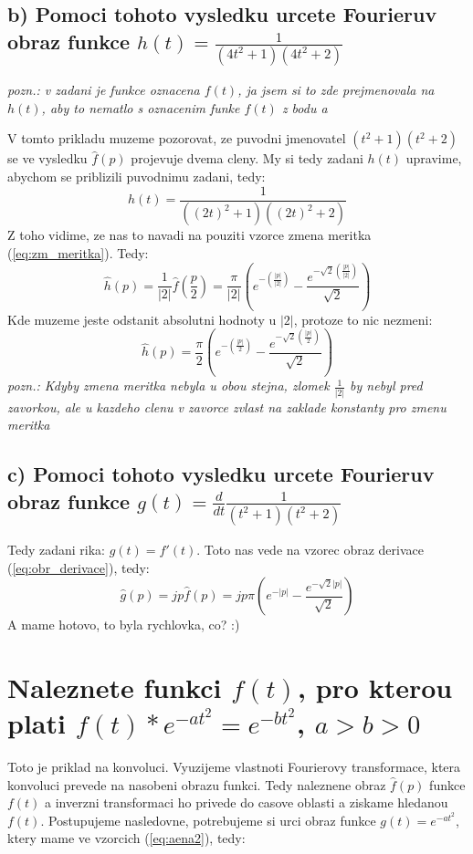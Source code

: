 \newpage

\subsection{b) Pomoci tohoto vysledku urcete Fourieruv obraz funkce $h(t)=\frac{1}{(4t^2+1)(4t^2+2)}$}
\textit{pozn.: v zadani je funkce oznacena $f(t)$, ja jsem si to zde prejmenovala na $h(t)$, aby to nematlo s oznacenim funke $f(t)$ z bodu a}

V tomto prikladu muzeme pozorovat, ze puvodni jmenovatel $(t^2+1)(t^2+2)$ se ve vysledku $\hat{f}(p)$ projevuje dvema cleny. My si tedy zadani $h(t)$ upravime, abychom se priblizili puvodnimu zadani, tedy:
$$h(t)=\frac{1}{((2t)^2+1)((2t)^2+2)}$$
Z toho vidime, ze nas to navadi na pouziti vzorce zmena meritka (\ref{eq:zm_meritka}). Tedy:
$$\hat{h}(p)=\frac{1}{|2|}\hat{f}\left( \frac{p}{2}\right)= \frac{\pi}{|2|} \left( e^{-\left( \frac{|p|}{|2|}\right)} -  \frac{e^{-\sqrt{2}\left( \frac{|p|}{|2|}\right)}}{\sqrt{2}} \right)$$
Kde muzeme jeste odstanit absolutni hodnoty u $|2|$, protoze to nic nezmeni:
$$\hat{h}(p)=\frac{\pi}{2} \left( e^{-\left( \frac{|p|}{2}\right)} -  \frac{e^{-\sqrt{2}\left( \frac{|p|}{2}\right)}}{\sqrt{2}} \right)$$
\textit{pozn.: Kdyby zmena meritka nebyla u obou stejna, zlomek $\frac{1}{|2|}$ by nebyl pred zavorkou, ale u kazdeho clenu v zavorce zvlast na zaklade konstanty pro zmenu meritka}

\newpage

\subsection{c) Pomoci tohoto vysledku urcete Fourieruv obraz funkce $g(t)= \frac{d}{dt}\frac{1}{(t^2+1)(t^2+2)}$}

Tedy zadani rika: $g(t) = f'(t)$. Toto nas vede na vzorec obraz derivace (\ref{eq:obr_derivace}), tedy:
$$\hat{g}(p) = jp\hat{f}(p)=jp \pi \left(e^{-|p|} -  \frac{e^{-\sqrt{2}|p|}}{\sqrt{2}}\right)$$
A mame hotovo, to byla rychlovka, co? :)

\newpage

\section{Naleznete funkci $f(t)$, pro kterou plati $f(t)*e^{-at^2}=e^{-bt^2}$, $a>b>0$}

Toto je priklad na konvoluci. Vyuzijeme vlastnoti Fourierovy transformace, ktera konvoluci prevede na nasobeni obrazu funkci. Tedy naleznene obraz $\hat{f}(p)$ funkce $f(t)$ a inverzni transformaci ho privede do casove oblasti a ziskame hledanou $f(t)$. Postupujeme nasledovne, potrebujeme si urci obraz funkce $g(t) = e^{-at^2}$, ktery mame ve vzorcich (\ref{eq:aena2}), tedy:

